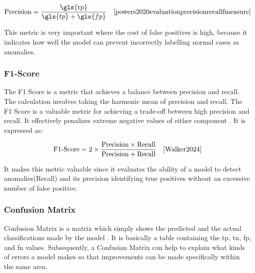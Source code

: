 \begin{equation}
    \text{Precision} = \frac{\text{\gls{tp}}}{\gls{tp} + \gls{fp}} \quad \text{\cite{powers2020evaluationprecisionrecallfmeasure}}
    \label{eq:precision}
\end{equation}

This metric is very important where the cost of false positives is high, because it indicates how well the model can prevent incorrectly labelling normal cases as anomalies. 

\subsubsection*{F1-Score}
\label{subsec:F1-Score}

The F1 Score is a metric that achieves a balance between precision and recall. The calculation involves taking the harmonic mean of precision and recall. The F1 Score is a valuable metric for achieving a trade-off between high precision and recall. It effectively penalizes extreme negative values of either component \cite{Walker2024}. It is expressed as:

\begin{equation}
\text{F1-Score} = 2 \times \frac{\text{Precision} \times \text{Recall}}{\text{Precision} + \text{Recall}} \quad \text{\cite{Walker2024}}
\end{equation}

It makes this metric valuable since it evaluates the ability of a model to detect anomalies(Recall) and  its precision identifying true positives without an excessive number of false positive. 

\subsubsection*{Confusion Matrix}
\label{subsec:Confusion Matrix}

Confusion Matrix is a matrix which simply shows the predicted and the actual classifications made by the model \cite{Kohavi1998}. It is basically a table containing the \gls{tp}, \gls{tn}, \gls{fp}, and \gls{fn} values. Subsequently, a Confusion Matrix can help to explain what kinds of errors a model makes so that improvements can be made specifically within the same area.

